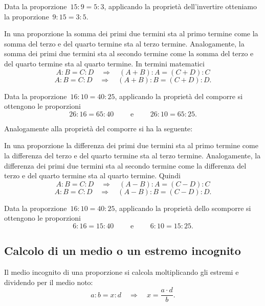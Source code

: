 \begin{exrig}
 \begin{esempio}
Data la proporzione~$15:9=5:3$, applicando la proprietà dell'invertire
otteniamo la proporzione~$9:15=3:5$.
 \end{esempio}
\end{exrig}

\begin{proprieta}
  In una proporzione la somma dei primi due termini sta al primo termine come la
somma del terzo e del quarto termine sta al terzo termine. Analogamente,
la somma dei primi due termini sta al secondo termine come la somma del terzo e del quarto
termine sta al quarto termine. In termini matematici
\[A:B=C:D\quad\Rightarrow\quad (A+B):A=(C+D):C\]
\[A:B=C:D\quad\Rightarrow\quad (A+B):B=(C+D):D.\]
\end{proprieta}

\begin{exrig}
 \begin{esempio}
Data la proporzione~$16:10=40:25$, applicando la proprietà del comporre si ottengono le proporzioni
\[26:16=65:40\qquad\text{ e }\qquad26:10=65:25.\]
 \end{esempio}
\end{exrig}

Analogamente alla proprietà del comporre si ha la seguente:

\begin{proprieta}
  In una proporzione la differenza dei primi due termini sta al primo termine come la differenza del
 terzo e del quarto termine sta al terzo termine. Analogamente, la differenza dei primi due termini
sta al secondo termine come la differenza del terzo e del quarto termine sta al quarto termine. Quindi
\[A:B=C:D\quad\Rightarrow\quad (A-B):A=(C-D):C\]
\[A:B=C:D\quad\Rightarrow\quad (A-B):B=(C-D):D.\]
\end{proprieta}

\begin{exrig}
 \begin{esempio}
Data la proporzione~$16:10=40:25$, applicando la proprietà dello scomporre si ottengono le proporzioni
\[6:16=15:40\qquad\text{ e }\qquad6:10=15:25.\]
 \end{esempio}
\end{exrig}

\subsection{Calcolo di un medio o un estremo incognito}
Il medio incognito di una proporzione si calcola moltiplicando gli estremi e dividendo per il medio noto:
\[a:b=x:d\quad\Rightarrow\quad x=\frac{a\cdot d}{b}.\]

